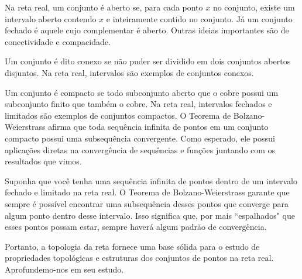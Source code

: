 \documentclass[Analysis/analysis_notes.tex]{subfiles}
\begin{document}
\begin{center}
\end{center}

Na reta real, um conjunto é aberto se, para cada ponto $x$ no conjunto, existe um intervalo aberto contendo $x$ e inteiramente contido no conjunto. Já um conjunto fechado é aquele cujo complementar é aberto.
Outras ideias importantes s\~ao de conectividade e compacidade.

Um conjunto é dito conexo se não puder ser dividido em dois conjuntos abertos disjuntos. Na reta real, intervalos são exemplos de conjuntos conexos.

Um conjunto é compacto se todo subconjunto aberto que o cobre possui um subconjunto finito que também o cobre. Na reta real, intervalos fechados e limitados são exemplos de conjuntos compactos.
O Teorema de Bolzano-Weierstrass afirma que toda sequência infinita de pontos em um conjunto compacto possui uma subsequência convergente. Como esperado,
ele possui aplica\c c\~oes diretas na converg\^encia de sequ\^encias e fun\c c\~oes juntando com os resultados que vimos.

Suponha que você tenha uma sequência infinita de pontos dentro de um intervalo fechado e limitado na reta real. O Teorema de Bolzano-Weierstrass garante que sempre é possível encontrar uma subsequência desses pontos que converge para algum ponto dentro desse intervalo. Isso significa que, por mais ``espalhados" que esses pontos possam estar, sempre haverá algum padrão de convergência.

Portanto, a topologia da reta fornece uma base sólida para o estudo de propriedades topológicas e estruturas dos conjuntos de pontos na reta real. Aprofundemo-nos
em seu estudo.
\end{document}
